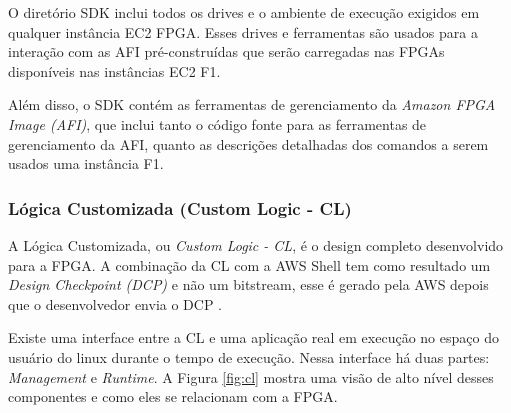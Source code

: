     O diretório SDK inclui todos os drives e o ambiente de execução exigidos em qualquer instância EC2 FPGA. Esses drives e ferramentas são usados para a interação com as AFI pré-construídas que serão carregadas nas FPGAs disponíveis nas instâncias EC2 F1.
    
    Além disso, o SDK contém as ferramentas de gerenciamento da \textit{Amazon FPGA Image (AFI)}, que inclui tanto o código fonte para as ferramentas de gerenciamento da AFI, quanto as descrições detalhadas dos comandos a serem usados  uma instância F1.
    

     
\subsubsection{Lógica Customizada (Custom Logic - CL)} \label{sec:cl}

A Lógica Customizada, ou \textit{Custom Logic - CL}, é o design completo desenvolvido para a FPGA. A combinação da CL com a AWS Shell tem como resultado um \textit{Design Checkpoint (DCP)} e não um bitstream, esse é gerado pela AWS depois que o desenvolvedor envia o DCP \cite{awsfaq}. 

Existe uma interface entre a CL e uma aplicação real em execução no espaço do usuário do linux durante o tempo de execução. Nessa interface há duas partes: \textit{Management} e \textit{Runtime}. A Figura \ref{fig:cl} mostra uma visão de alto nível desses componentes e como eles se relacionam com a FPGA.

\begin{figure}[htb!] 
   	    \captionsetup{width=15cm}%
\end{figure}

